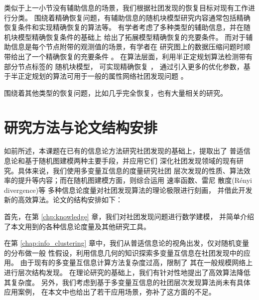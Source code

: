 类似于上一小节没有辅助信息的场景，我们根据社团发现的恢复目标对现有工作进行分类。
围绕着精确恢复问题，有辅助信息的随机块模型研究内容通常包括精确恢复条件和实现精确恢复的算法等。
有学者考虑了多种类型的辅助信息，并在随机块模型精确恢复条件的基础上
给出了拓展模型精确恢复的充要条件\cite{saad2018community, esmaeili2019community}。
而对于辅助信息是每个节点附带的观测值的场景，有学者在
研究图上的数据压缩问题时顺带给出了一个精确恢复的充要条件 \cite{abbe17sideinfo}。
在算法层面，利用半正定规划算法检测带有部分节点标签的 随机块模型，
可实现精确恢复 \cite{esmaeili2019exact}，
通过引入更多的优化参数，基于半正定规划的算法可用于一般的属性网络社团发现问题
\cite{tang2023semidefinite}。


围绕着其他类型的恢复问题，比如几乎完全恢复，也有大量相关的研究\cite{kanade2016global, deshpande2018contextual}。

\section{研究方法与论文结构安排}
如前所述，本课题在已有的信息论方法研究社团发现的基础上，提取出了
普适信息论和基于随机图建模两种主要手段，并应用它们
深化社团发现领域的现有研究。具体来说，我们使用多变量互信息的度量研究社团
层次发现的性质、算法效率的提升等内容；而在随机图建模方面，则综合运用
速率函数、雷尼
散度(Rényi divergence)等
多种信息论度量对社团发现算法的理论极限进行刻画，
并借此开发新的高效算法。论文的结构安排如下：

首先，在第 \ref{chp:knowledge} 章，我们对社团发现问题进行数学建模，
并简单介绍了本文用到的各种信息论度量及其他研究工具。

在第 \ref{chap:info_clustering} 章中，我们从普适信息论的视角出发，仅对随机变量的分布做一般
性假设，利用信息几何的知识探索多变量互信息在社团发现中的应用。
由于现有的多变量互信息计算方法复杂度过高，限制了
其在一般规模网络上进行层次结构发现。
在理论研究的基础上，我们有针对性地提出了高效算法降低其复杂度。
另外，我们考虑到基于多变量互信息的社团层次发现算法尚未有具体应用案例，
在本文中也给出了若干应用场景，弥补了这方面的不足。

